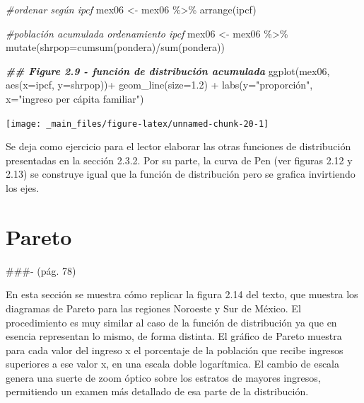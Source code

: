 \documentclass[
]{book}
\newenvironment{Shaded}{\begin{snugshade}}{\end{snugshade}}
\newcommand{\AttributeTok}[1]{\textcolor[rgb]{0.77,0.63,0.00}{#1}}
\newcommand{\CommentTok}[1]{\textcolor[rgb]{0.56,0.35,0.01}{\textit{#1}}}
\newcommand{\DocumentationTok}[1]{\textcolor[rgb]{0.56,0.35,0.01}{\textbf{\textit{#1}}}}
\newcommand{\FloatTok}[1]{\textcolor[rgb]{0.00,0.00,0.81}{#1}}
\newcommand{\FunctionTok}[1]{\textcolor[rgb]{0.00,0.00,0.00}{#1}}
\newcommand{\NormalTok}[1]{#1}
\newcommand{\OtherTok}[1]{\textcolor[rgb]{0.56,0.35,0.01}{#1}}
\newcommand{\SpecialCharTok}[1]{\textcolor[rgb]{0.00,0.00,0.00}{#1}}
\newcommand{\StringTok}[1]{\textcolor[rgb]{0.31,0.60,0.02}{#1}}
\begin{document}
\begin{Shaded}
\begin{Highlighting}[]
\CommentTok{\#ordenar según ipcf}
\NormalTok{mex06 }\OtherTok{\textless{}{-}}\NormalTok{ mex06 }\SpecialCharTok{\%\textgreater{}\%} \FunctionTok{arrange}\NormalTok{(ipcf)}

\CommentTok{\#población acumulada ordenamiento ipcf}
\NormalTok{mex06 }\OtherTok{\textless{}{-}}\NormalTok{ mex06 }\SpecialCharTok{\%\textgreater{}\%} \FunctionTok{mutate}\NormalTok{(}\AttributeTok{shrpop=}\FunctionTok{cumsum}\NormalTok{(pondera)}\SpecialCharTok{/}\FunctionTok{sum}\NormalTok{(pondera))}

\DocumentationTok{\#\# Figure 2.9 {-} función de distribución acumulada}
\FunctionTok{ggplot}\NormalTok{(mex06, }\FunctionTok{aes}\NormalTok{(}\AttributeTok{x=}\NormalTok{ipcf, }\AttributeTok{y=}\NormalTok{shrpop))}\SpecialCharTok{+}
  \FunctionTok{geom\_line}\NormalTok{(}\AttributeTok{size=}\FloatTok{1.2}\NormalTok{) }\SpecialCharTok{+}
    \FunctionTok{labs}\NormalTok{(}\AttributeTok{y=}\StringTok{"proporción"}\NormalTok{, }\AttributeTok{x=}\StringTok{"ingreso per cápita familiar"}\NormalTok{)}
\end{Highlighting}
\end{Shaded}

\texttt{[image: \_main\_files/figure-latex/unnamed-chunk-20-1]}

Se deja como ejercicio para el lector elaborar las otras funciones de distribución presentadas en la sección 2.3.2. Por su parte, la curva de Pen (ver figuras 2.12 y 2.13) se construye igual que la función de distribución pero se grafica invirtiendo los ejes.

\hypertarget{pareto}{%
\section{Pareto}\label{pareto}}

\#\#\#- (pág. 78)

En esta sección se muestra cómo replicar la figura 2.14 del texto, que muestra los diagramas de Pareto para las regiones Noroeste y Sur de México. El procedimiento es muy similar al caso de la función de distribución ya que en esencia representan lo mismo, de forma distinta. El gráfico de Pareto muestra para cada valor del ingreso x el porcentaje de la población que recibe ingresos superiores a ese valor x, en una escala doble logarítmica. El cambio de escala genera una suerte de zoom óptico sobre los estratos de mayores ingresos, permitiendo un examen más detallado de esa parte de la distribución.
\end{document}
